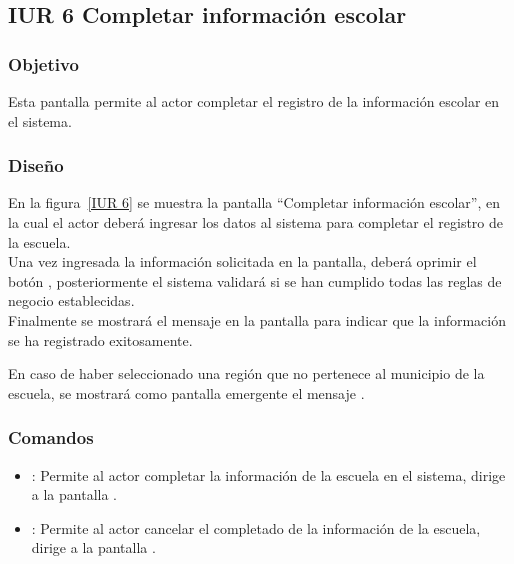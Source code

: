 \subsection{IUR 6 Completar información escolar}

\subsubsection{Objetivo}

     Esta pantalla permite al actor   completar el registro de la información escolar en el sistema.

\subsubsection{Diseño}

   En la figura~\ref{IUR 6} se muestra la pantalla ``Completar información escolar'', en la cual el actor deberá ingresar los datos al sistema para completar el registro de la escuela.\\
    
    Una vez ingresada la información solicitada en la pantalla, deberá oprimir el botón , posteriormente  el sistema validará %
    si se han cumplido todas las reglas de negocio establecidas.\\
    
    Finalmente se mostrará el mensaje  en la pantalla  para indicar que la información se ha registrado exitosamente.
    
	En caso de haber seleccionado una región que no pertenece al municipio de la escuela, se mostrará como pantalla emergente el mensaje .
    


\subsubsection{Comandos} 
    \begin{itemize}
	\item {}: Permite al actor completar la información de la escuela en el sistema, dirige a la pantalla .
    \item {}: Permite al actor cancelar el completado de la información de la escuela, dirige a la pantalla .
    \end{itemize}



